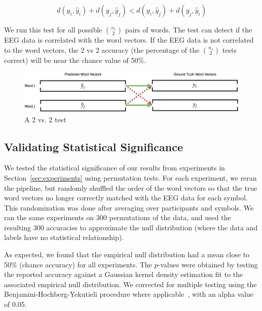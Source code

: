 \begin{equation}
  d(y_i, \hat{y}_i) + d(y_j, \hat{y}_j) < d(y_i, \hat{y}_j) + d(y_j, \hat{y}_i)
  \label{eq:2vs2}
\end{equation}
  
\noindent We run this test for all possible ${\binom{n_s}{2}}$ pairs of words. The \tvt test can detect if the EEG data is correlated with the word vectors. If the EEG data is not correlated to the word vectors, the 2 vs 2 accuracy (the percentage of the ${\binom{n_s}{2}}$ \tvt tests correct) will be  near the chance value of 50\%.

\begin{figure}[t]
  \centering
  \includegraphics[width=\textwidth]{figures/2vs2}
  \caption{A 2 vs. 2 test}
  \label{fig:2vs2}
\end{figure}

\subsection{Validating Statistical Significance}
We tested the statistical significance of our results from experiments in Section~\ref{sec:experiments} using permutation tests. For each experiment, we reran the pipeline, but randomly shuffled the order of the word vectors so that the true word vectors no longer correctly matched with the EEG data for each symbol. This randomization was done after averaging over participants and symbols. We ran the same experiments on 300 permutations of the data, and used the resulting 300 \tvt accuracies to approximate the null distribution (where the data and labels have no statistical relationship). 
  
As expected, we found that the empirical null distribution had a mean close to 50\% (chance accuracy) for all experiments. The $p$-values were obtained by testing the reported accuracy against a Gaussian kernel density estimation fit to the associated empirical null distribution. We corrected for multiple testing using the Benjamini-Hochberg-Yekutieli procedure where applicable~\cite{benjamini2001control}, with an alpha value of 0.05.
